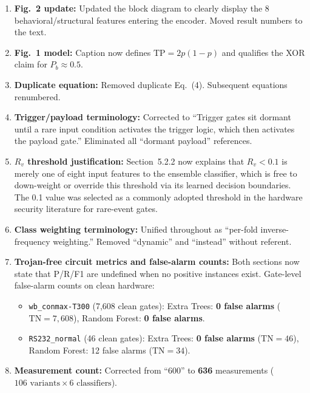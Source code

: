 \documentclass[11pt,a4paper]{article}
\begin{document}
\begin{enumerate}[leftmargin=*]
    \item[\textbf{M5.}] \textbf{Fig.\ 2 update:} Updated the block diagram to clearly display the 8 behavioral/structural features entering the encoder. Moved result numbers to the text.

    \item[\textbf{M6.}] \textbf{Fig.\ 1 model:} Caption now defines $\text{TP} = 2p(1-p)$ and qualifies the XOR claim for $P_b \approx 0.5$.

    \item[\textbf{M7.}] \textbf{Duplicate equation:} Removed duplicate Eq.~(4). Subsequent equations renumbered.

    \item[\textbf{M8.}] \textbf{Trigger/payload terminology:} Corrected to ``Trigger gates sit dormant until a rare input condition activates the trigger logic, which then activates the payload gate.'' Eliminated all ``dormant payload'' references.

    \item[\textbf{M9.}] \textbf{$R_v$ threshold justification:} Section~5.2.2 now explains that $R_v < 0.1$ is merely one of eight input features to the ensemble classifier, which is free to down-weight or override this threshold via its learned decision boundaries. The 0.1 value was selected as a commonly adopted threshold in the hardware security literature for rare-event gates.

    \item[\textbf{M10.}] \textbf{Class weighting terminology:} Unified throughout as ``per-fold inverse-frequency weighting.'' Removed ``dynamic'' and ``instead'' without referent.

    \item[\textbf{M11.}] \textbf{Trojan-free circuit metrics and false-alarm counts:} Both sections now state that P/R/F1 are undefined when no positive instances exist. Gate-level false-alarm counts on clean hardware:
    \begin{itemize}
        \item \texttt{wb\_conmax-T300} (7,608 clean gates): Extra Trees: \textbf{0 false alarms} ($\text{TN}=7,608$), Random Forest: \textbf{0 false alarms}.
        \item \texttt{RS232\_normal} (46 clean gates): Extra Trees: \textbf{0 false alarms} ($\text{TN}=46$), Random Forest: 12 false alarms ($\text{TN}=34$).
    \end{itemize}

    \item[\textbf{M12.}] \textbf{Measurement count:} Corrected from ``600'' to \textbf{636} measurements ($106 \text{ variants} \times 6 \text{ classifiers}$).


\end{enumerate}
\end{document}
